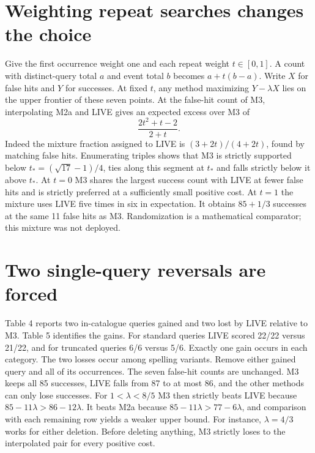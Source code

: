 \documentclass[11pt]{article}
\begin{document}
\section{Weighting repeat searches changes the choice}
Give the first occurrence weight one and each repeat weight $t\in[0,1]$. A count with distinct-query total $a$ and event total $b$ becomes $a+t(b-a)$. Write $X$ for false hits and $Y$ for successes. At fixed $t$, any method maximizing $Y-\lambda X$ lies on the upper frontier of these seven points.
At the false-hit count of M3, interpolating M2a and LIVE gives an expected excess over M3 of
\[
\frac{2t^2+t-2}{2+t}.
\]
Indeed the mixture fraction assigned to LIVE is $(3+2t)/(4+2t)$, found by matching false hits. Enumerating triples shows that M3 is strictly supported below $t_*=(\sqrt{17}-1)/4$, ties along this segment at $t_*$ and falls strictly below it above $t_*$. At $t=0$ M3 shares the largest success count with LIVE at fewer false hits and is strictly preferred at a sufficiently small positive cost.
At $t=1$ the mixture uses LIVE five times in six in expectation. It obtains $85+1/3$ successes at the same 11 false hits as M3. Randomization is a mathematical comparator; this mixture was not deployed.
\section{Two single-query reversals are forced}
Table 4 reports two in-catalogue queries gained and two lost by LIVE relative to M3. Table 5 identifies the gains. For standard queries LIVE scored 22/22 versus 21/22, and for truncated queries 6/6 versus 5/6. Exactly one gain occurs in each category. The two losses occur among spelling variants.
Remove either gained query and all of its occurrences. The seven false-hit counts are unchanged. M3 keeps all 85 successes, LIVE falls from 87 to at most 86, and the other methods can only lose successes. For $1<\lambda<8/5$ M3 then strictly beats LIVE because $85-11\lambda>86-12\lambda$. It beats M2a because $85-11\lambda>77-6\lambda$, and comparison with each remaining row yields a weaker upper bound. For instance, $\lambda=4/3$ works for either deletion. Before deleting anything, M3 strictly loses to the interpolated pair for every positive cost.
\newpage
\end{document}
